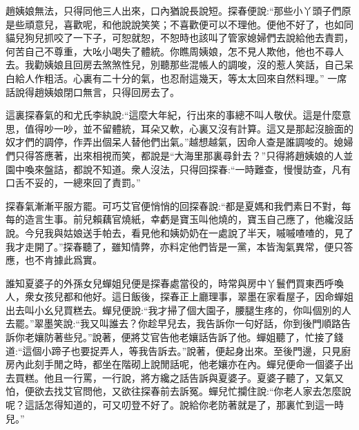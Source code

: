 \begin{parag}
    趙姨娘無法，只得同他三人出來，口內猶說長說短。探春便說:“那些小丫頭子們原是些頑意兒，喜歡呢，和他說說笑笑；不喜歡便可以不理他。便他不好了，也如同貓兒狗兒抓咬了一下子，可恕就恕，不恕時也該叫了管家媳婦們去說給他去責罰，何苦自己不尊重，大吆小喝失了體統。你瞧周姨娘，怎不見人欺他，他也不尋人去。我勸姨娘且回房去煞煞性兒，別聽那些混帳人的調唆，沒的惹人笑話，自己呆白給人作粗活。心裏有二十分的氣，也忍耐這幾天，等太太回來自然料理。” 一席話說得趙姨娘閉口無言，只得回房去了。
\end{parag}


\begin{parag}
    這裏探春氣的和尤氏李紈說:“這麼大年紀，行出來的事總不叫人敬伏。這是什麼意思，值得吵一吵，並不留體統，耳朵又軟，心裏又沒有計算。這又是那起沒臉面的奴才們的調停，作弄出個呆人替他們出氣。”越想越氣，因命人查是誰調唆的。媳婦們只得答應著，出來相視而笑，都說是“大海里那裏尋針去？”只得將趙姨娘的人並園中喚來盤詰，都說不知道。衆人沒法，只得回探春:“一時難查，慢慢訪查，凡有口舌不妥的，一總來回了責罰。”
\end{parag}


\begin{parag}
    探春氣漸漸平服方罷。可巧艾官便悄悄的回探春說:“都是夏媽和我們素日不對，每每的造言生事。前兒賴藕官燒紙，幸虧是寶玉叫他燒的，寶玉自己應了，他纔沒話說。今兒我與姑娘送手帕去，看見他和姨奶奶在一處說了半天，嘁嘁喳喳的，見了我才走開了。”探春聽了，雖知情弊，亦料定他們皆是一黨，本皆淘氣異常，便只答應，也不肯據此爲實。
\end{parag}


\begin{parag}
    誰知夏婆子的外孫女兒蟬姐兒便是探春處當役的，時常與房中丫鬟們買東西呼喚人，衆女孩兒都和他好。這日飯後，探春正上廳理事，翠墨在家看屋子，因命蟬姐出去叫小幺兒買糕去。蟬兒便說:“我才掃了個大園子，腰腿生疼的，你叫個別的人去罷。”翠墨笑說:“我又叫誰去？你趁早兒去，我告訴你一句好話，你到後門順路告訴你老孃防著些兒。”說著，便將艾官告他老孃話告訴了他。蟬姐聽了，忙接了錢道:“這個小蹄子也要捉弄人，等我告訴去。”說著，便起身出來。至後門邊，只見廚房內此刻手閒之時，都坐在階砌上說閒話呢，他老孃亦在內。蟬兒便命一個婆子出去買糕。他且一行罵，一行說，將方纔之話告訴與夏婆子。夏婆子聽了，又氣又怕，便欲去找艾官問他，又欲往探春前去訴冤。蟬兒忙攔住說:“你老人家去怎麼說呢？這話怎得知道的，可又叨登不好了。說給你老防著就是了，那裏忙到這一時兒。”
\end{parag}


